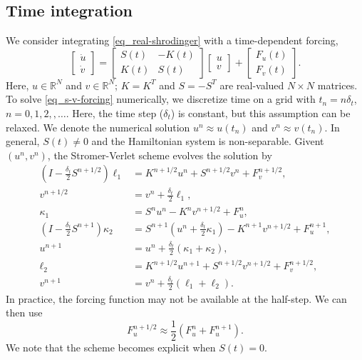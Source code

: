 \documentclass[11pt]{article}
\begin{document}
\subsection{Time integration}
We consider integrating \eqref{eq_real-shrodinger} with a time-dependent forcing,
\begin{equation}\label{eq_s-v-forcing}
  \begin{bmatrix} \dot{u}\\ \dot{v} \end{bmatrix} =
%
  \begin{bmatrix}
    S(t) & -K(t) \\ K(t) & S(t)
  \end{bmatrix}     
  \begin{bmatrix} u\\ v \end{bmatrix}
  + \begin{bmatrix} F_u(t) \\ F_v(t) \end{bmatrix}.
\end{equation}
Here, $u\in \mathbb{R}^N$ and $v\in \mathbb{R}^N$; $K=K^T$ and $S=-S^T$ are real-valued $N\times N$
matrices.  To solve \eqref{eq_s-v-forcing} numerically, we discretize time on a grid with $t_n = n
\delta_t$, $n=0,1,2,,\ldots$. Here, the time step ($\delta_t$) is constant, but this assumption can
be relaxed. We denote the numerical solution $u^n\approx u(t_n)$ and $v^n\approx v(t_n)$.  In
general, $S(t)\ne0$ and the Hamiltonian system is non-separable. Givent $(u^n, v^n)$, the 
Stromer-Verlet scheme evolves the solution by
\begin{align*}
  \left(I - \frac{\delta_t}{2} S^{n+1/2}\right) \ell_1 &= K^{n+1/2} u^n + S^{n+1/2} v^n + F_v^{n+1/2},\\
%
  v^{n+1/2} &= v^n + \frac{\delta_t}{2}\ell_1,\\
  \kappa_1 &= S^{n} u^n - K^{n} v^{n+1/2} +
  F_u^{n},\\
%
  \left(I - \frac{\delta_t}{2} S^{n+1}\right) \kappa_2 &= S^{n+1}\left( u^n + \frac{\delta_t}{2}
  \kappa_1 \right) - K^{n+1}  v^{n+1/2} + F_u^{n+1},\\
  u^{n+1} &= u^n + \frac{\delta_t}{2}\left( \kappa_1 + \kappa_2 \right),\\
%
  \ell_2 &= K^{n+1/2} u^{n+1} + S^{n+1/2}  v^{n+1/2} + F_v^{n+1/2},\\
  v^{n+1} &= v^n + \frac{\delta_t}{2}\left( \ell_1 + \ell_2 \right).
\end{align*}
In practice, the forcing function may not be available at the half-step. We can then use
\[
F_u^{n+1/2} \approx \frac{1}{2}\left( F_u^{n} + F_u^{n+1}\right).
\]
We note that the scheme becomes explicit when $S(t)=0$. 
\end{document}
